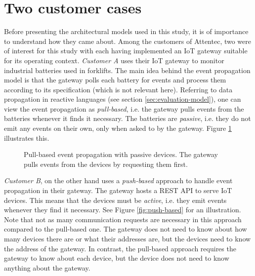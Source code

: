 \section{Two customer cases}
\label{sec:customer-cases}

Before presenting the architectural models used in this study, it is of
importance to understand how they came about. Among the customers of Attentec,
two were of interest for this study with each having implemented an IoT gateway
suitable for its operating context. \textit{Customer A} uses their IoT gateway
to monitor industrial batteries used in forklifts. The main idea behind the
event propagation model is that the gateway polls each battery for events and
process them according to its specification (which is not relevant here).
Referring to data propagation in reactive languages (see section
\ref{sec:evaluation-model}), one can view the event propagation as
\textit{pull-based}, i.e. the gateway pulls events from the batteries whenever
it finds it necessary. The batteries are \textit{passive}, i.e. they do not
emit any events on their own, only when asked to by the gateway. Figure
\ref{fig:pull-based} illustrates this.

\begin{figure}[h!]
    \centering
    \caption[Pull-based event propagation.]{Pull-based event propagation with
    passive devices. The gateway pulls events from the devices by requesting
    them first.}
    \label{fig:pull-based}
\end{figure}

\textit{Customer B}, on the other hand uses a \textit{push-based} approach to
handle event propagation in their gateway. The gateway hosts a REST API to
serve IoT devices. This means that the devices must be \textit{active}, i.e.
they emit events whenever they find it necessary. See Figure
\ref{fig:push-based} for an illustration. Note that not as many communication
requests are necessary in this approach compared to the pull-based one. The
gateway does not need to know about how many devices there are or what their
addresses are, but the devices need to know the address of the gateway. In
contrast, the pull-based approach requires the gateway to know about each
device, but the device does not need to know anything about the gateway.

